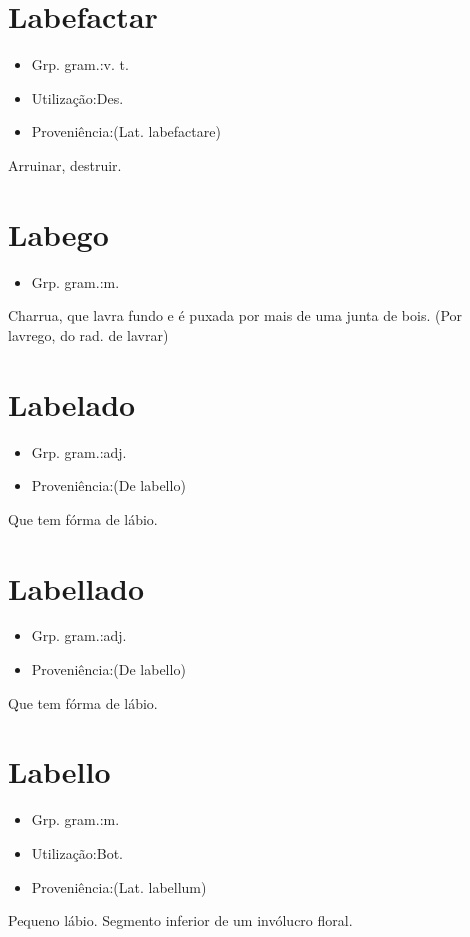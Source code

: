 \section{Labefactar}
\begin{itemize}
\item {Grp. gram.:v. t.}
\end{itemize}
\begin{itemize}
\item {Utilização:Des.}
\end{itemize}
\begin{itemize}
\item {Proveniência:(Lat. \textunderscore labefactare\textunderscore )}
\end{itemize}
Arruinar, destruir.
\section{Labego}
\begin{itemize}
\item {Grp. gram.:m.}
\end{itemize}
Charrua, que lavra fundo e é puxada por mais de uma junta de bois.
(Por \textunderscore lavrego\textunderscore , do rad. de \textunderscore lavrar\textunderscore )
\section{Labelado}
\begin{itemize}
\item {Grp. gram.:adj.}
\end{itemize}
\begin{itemize}
\item {Proveniência:(De \textunderscore labello\textunderscore )}
\end{itemize}
Que tem fórma de lábio.
\section{Labellado}
\begin{itemize}
\item {Grp. gram.:adj.}
\end{itemize}
\begin{itemize}
\item {Proveniência:(De \textunderscore labello\textunderscore )}
\end{itemize}
Que tem fórma de lábio.
\section{Labello}
\begin{itemize}
\item {Grp. gram.:m.}
\end{itemize}
\begin{itemize}
\item {Utilização:Bot.}
\end{itemize}
\begin{itemize}
\item {Proveniência:(Lat. \textunderscore labellum\textunderscore )}
\end{itemize}
Pequeno lábio.
Segmento inferior de um invólucro floral.
